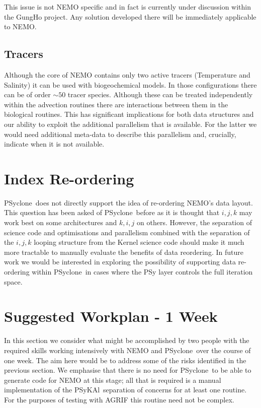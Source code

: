 \documentclass{article}
\newcommand{\psykal}{{PS}y{KA}l}
\newcommand{\psyclone}{{PS}yclone}
\begin{document}
This issue is not NEMO specific and in fact is currently under
discussion within the GungHo project. Any solution developed there
will be immediately applicable to NEMO.

\subsection{Tracers}

Although the core of NEMO contains only two active tracers
(Temperature and Salinity) it can be used with biogeochemical
models. In those configurations there can be of order $\sim 50$ tracer
species. Although these can be treated independently within the
advection routines there are interactions between them in the
biological routines. This has significant implications for both data
structures and our ability to exploit the additional parallelism that
is available. For the latter we would need additional meta-data to
describe this parallelism and, crucially, indicate when it is not
available.

\section{Index Re-ordering}

\psyclone\ does not directly support the idea of re-ordering NEMO's data
layout. This question has been asked of \psyclone\ before as it is
thought that $i,j,k$ may work best on some architectures and $k,i,j$ on
others. However, the separation of science code and optimisations and
parallelism combined with the separation of the $i,j,k$ looping
structure from the Kernel science code should make it much more
tractable to manually evaluate the benefits of data reordering. In
future work we would be interested in exploring the possibility of
supporting data re-ordering within \psyclone\ in cases where the PSy
layer controls the full iteration space.

\section{Suggested Workplan - 1 Week}

In this section we consider what might be accomplished by two people
with the required skills working intensively with NEMO and \psyclone\
over the course of one week. The aim here would be to address some of
the risks identified in the previous section. We emphasise that there
is no need for \psyclone\ to be able to generate code for NEMO at this
stage; all that is required is a manual implementation of the
\psykal\ separation of concerns for at least one routine. For the
purposes of testing with AGRIF this routine need not be complex.
\end{document}
